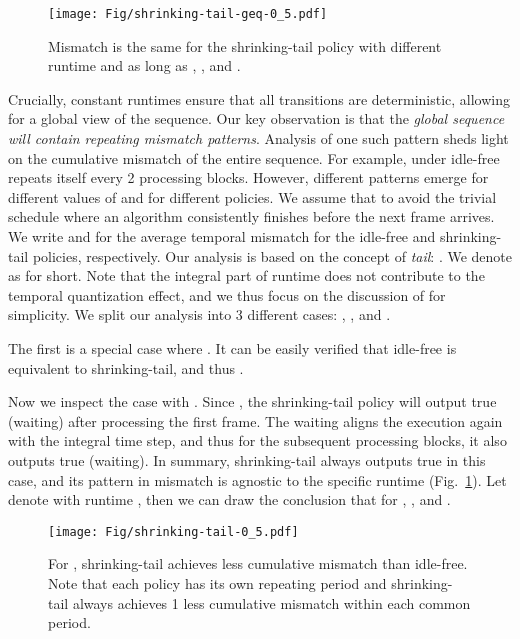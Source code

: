 \begin{figure}[!b]
\centering
\texttt{[image: Fig/shrinking-tail-geq-0\_5.pdf]}

\caption{Mismatch is the same for the shrinking-tail policy with different runtime  and  as long as , , and .
}
\label{fig:shrinking-tail-geq-0.5}
\end{figure}

 Crucially, constant runtimes ensure that all transitions are deterministic, allowing for a global view of the sequence. Our key observation is that the {\em global sequence will contain repeating mismatch patterns}. Analysis of one such pattern sheds light on the cumulative mismatch of the entire sequence. For example,  under idle-free repeats itself every 2 processing blocks. However, different patterns emerge for different values of  and for different policies.
We assume that  to avoid the trivial schedule where an algorithm consistently finishes before the next frame arrives. We write  and  for the average temporal mismatch  for the idle-free and shrinking-tail policies, respectively. Our analysis is based on the concept of {\em tail}:
. We denote  as  for short. Note that the integral part of runtime does not contribute to the temporal quantization effect, and we thus focus on the discussion of  for simplicity.
We split our analysis into 3 different cases:
, , and .

 The first is a special case where . It can be easily verified that idle-free is equivalent to shrinking-tail, and thus .


Now we inspect the case with . Since , the shrinking-tail policy will output true (waiting) after processing the first frame. The waiting aligns the execution again with the integral time step, and thus for the subsequent processing blocks, it also outputs true (waiting). In summary, shrinking-tail always outputs true in this case, and its pattern in mismatch is agnostic to the specific runtime  (Fig.~\ref{fig:shrinking-tail-geq-0.5}). Let  denote   with runtime ,
then we can draw the conclusion that 
 for , , and .

\begin{figure}[!b]
\centering
\texttt{[image: Fig/shrinking-tail-0\_5.pdf]}

\caption{For , shrinking-tail achieves less cumulative mismatch than idle-free. Note that each policy has its own repeating period and shrinking-tail always achieves 1 less cumulative mismatch within each common period.
}
\label{fig:shrinking-tail-0.5}
\end{figure}

